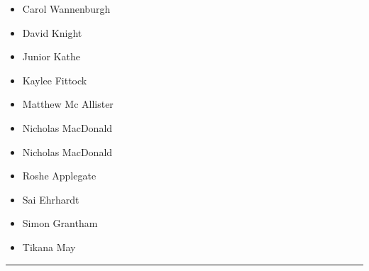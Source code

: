 \documentclass[10pt]{article}
\begin{document}
	\begin{multicols}{2}

		\begin{itemize}
									\item Carol Wannenburgh
									\item David Knight
									\item Junior Kathe
									\item Kaylee Fittock
									\item Matthew Mc Allister
									\item Nicholas MacDonald
						\end{itemize}

		\vfill\null
		\columnbreak

		\begin{itemize}
									\item Nicholas MacDonald
									\item Roshe Applegate
									\item Sai Ehrhardt
									\item Simon Grantham
									\item Tikana May
						\end{itemize}

		\vfill\null

		\end{multicols}



			\vspace{0.5cm}
	\hrule
	\vspace{0.5cm}
\end{document}
